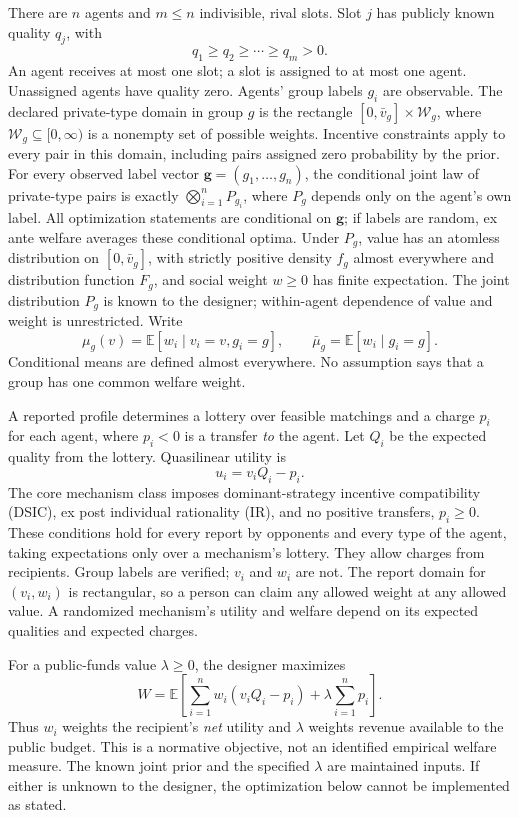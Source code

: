 \documentclass[11pt]{article}
\newcommand{\E}{\mathbb E}
\begin{document}
There are $n$ agents and $m\le n$ indivisible, rival slots. Slot $j$ has publicly known quality $q_j$, with
\[
q_1\ge q_2\ge\cdots\ge q_m>0.
\]
An agent receives at most one slot; a slot is assigned to at most one agent. Unassigned agents have quality zero. Agents' group labels $g_i$ are observable. The declared private-type domain in group $g$ is the rectangle $[0,\bar v_g]\times\mathcal W_g$, where $\mathcal W_g\subseteq[0,\infty)$ is a nonempty set of possible weights. Incentive constraints apply to every pair in this domain, including pairs assigned zero probability by the prior. For every observed label vector $\mathbf g=(g_1,\ldots,g_n)$, the conditional joint law of private-type pairs is exactly $\bigotimes_{i=1}^n P_{g_i}$, where $P_g$ depends only on the agent's own label. All optimization statements are conditional on $\mathbf g$; if labels are random, ex ante welfare averages these conditional optima. Under $P_g$, value has an atomless distribution on $[0,\bar v_g]$, with strictly positive density $f_g$ almost everywhere and distribution function $F_g$, and social weight $w\ge0$ has finite expectation. The joint distribution $P_g$ is known to the designer; within-agent dependence of value and weight is unrestricted. Write
\[
\mu_g(v)=\E[w_i\mid v_i=v,g_i=g],\qquad
\bar\mu_g=\E[w_i\mid g_i=g].
\]
Conditional means are defined almost everywhere. No assumption says that a group has one common welfare weight.

A reported profile determines a lottery over feasible matchings and a charge $p_i$ for each agent, where $p_i<0$ is a transfer \emph{to} the agent. Let $Q_i$ be the expected quality from the lottery. Quasilinear utility is
\begin{equation}\label{eq:utility}
u_i=v_iQ_i-p_i.
\end{equation}
The core mechanism class imposes dominant-strategy incentive compatibility (DSIC), ex post individual rationality (IR), and no positive transfers, $p_i\ge0$. These conditions hold for every report by opponents and every type of the agent, taking expectations only over a mechanism's lottery. They allow charges from recipients. Group labels are verified; $v_i$ and $w_i$ are not. The report domain for $(v_i,w_i)$ is rectangular, so a person can claim any allowed weight at any allowed value. A randomized mechanism's utility and welfare depend on its expected qualities and expected charges.

For a public-funds value $\lambda\ge0$, the designer maximizes
\begin{equation}\label{eq:objective}
W=\E\!\left[\sum_{i=1}^n w_i(v_iQ_i-p_i)+\lambda\sum_{i=1}^n p_i\right].
\end{equation}
Thus $w_i$ weights the recipient's \emph{net} utility and $\lambda$ weights revenue available to the public budget. This is a normative objective, not an identified empirical welfare measure. The known joint prior and the specified $\lambda$ are maintained inputs. If either is unknown to the designer, the optimization below cannot be implemented as stated.
\end{document}

